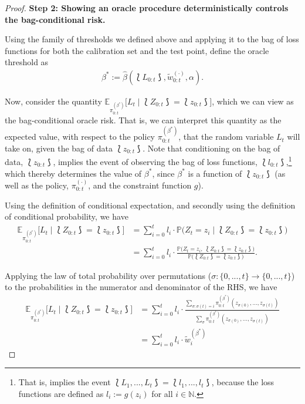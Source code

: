 \begin{proof}
\vspace{1cm}

\textbf{Step 2: Showing an oracle procedure deterministically controls the bag-conditional risk.}

Using the family of thresholds we defined above and applying it to the bag of loss functions for both the calibration set and the test point, define the oracle threshold as
\begin{align}\label{eq:cpc_oracle_lambda_def}
    \beta^* := \hat{\beta}(\lbag L_{0:t} \rbag, \tilde{w}_{0:t}^{(\cdot)},  \alpha).
\end{align}

Now, consider the quantity $\mathbb{E}_{\pi_{0:t}^{(\beta^*)}}\big[L_{t} \mid \lbag Z_{0:t} \rbag = \lbag z_{0:t} \rbag\big]$, which we can view as the bag-conditional oracle risk. That is, we can interpret this quantity as the expected value, with respect to the policy $\pi_{0:t}^{(\beta^*)}$, that the random variable $L_{t}$ will take on, given the bag of data $\lbag z_{0:t} \rbag$. Note that conditioning on the bag of data, $\lbag z_{0:t} \rbag$, implies the event of observing the bag of loss functions, $\lbag l_{0:t} \rbag$,\footnote{That is, implies the event $\lbag L_{1}, ..., L_{t}\rbag = \lbag l_1, ..., l_{t} \rbag$, because the loss functions are defined as $l_i:=g(z_i)$ for all $i\in \mathbb{N}$.} which thereby determines the value of $\beta^*$, since $\beta^*$ is a function of $\lbag z_{0:t}\rbag$ (as well as the policy, $\pi_{0:t}^{(\cdot)}$, and the constraint function $g$). 

Using the definition of conditional expectation, and secondly using the definition of conditional probability, we have
\begin{align*}
    \mathbb{E}_{\pi_{0:t}^{(\beta^*)}}\big[L_{t} \mid \lbag Z_{0:t} \rbag = \lbag z_{0:t} \rbag\big] & = \sum_{i=0}^{t}l_i\cdot \mathbb{P}\big(Z_{t} = z_{i} \mid \lbag Z_{0:t} \rbag = \lbag z_{0:t} \rbag \big) \\
    & = \sum_{i=0}^{t}l_i\cdot \frac{\mathbb{P}\big(Z_{t}=z_{i}, \ \lbag Z_{0:t} \rbag = \lbag z_{0:t} \rbag \big)}{\mathbb{P}\big(\lbag Z_{0:t} \rbag = \lbag z_{0:t} \rbag\big)}.
\end{align*}

Applying the law of total probability over permutations ($\sigma:\{0, ..., t\}\rightarrow\{0, ..., t\}$) to the probabilities in the numerator and denominator of the RHS, we have
\begin{align*}
    \mathbb{E}_{\pi_{0:t}^{(\beta^*)}}\big[L_{t} \mid \lbag Z_{0:t} \rbag =  \lbag z_{0:t} \rbag\big]
    & = \sum_{i=0}^{t}l_i\cdot \frac{\sum_{\sigma:\sigma(t)=i}\pi_{0:t}^{(\beta^*)}(z_{\sigma(0)}, ..., z_{\sigma(t)})}{\sum_{\sigma}\pi_{0:t}^{(\beta^*)}(z_{\sigma(0)}, ..., z_{\sigma(t)})} \\
    & = \sum_{i=0}^{t}l_i\cdot \tilde{w}_i^{(\beta^*)}
\end{align*}


\end{proof}
